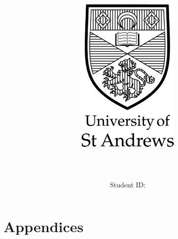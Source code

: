 \documentclass{article}
\title{\includegraphics[width=5cm]{res/logo.png}\\[1cm] 
\textbf{\Huge{\myTitle}\\}
\huge\mySubtitle}
\author{Student ID: \myStudId}
\date{\myDateToday}
\begin{document}
\maketitle
\pagebreak
\tableofcontents
\pagebreak


% 
% 
% 


\newpage
\section*{\Large Appendices}

\newpage
\nocite{*}
\printbibliography
\end{document}
